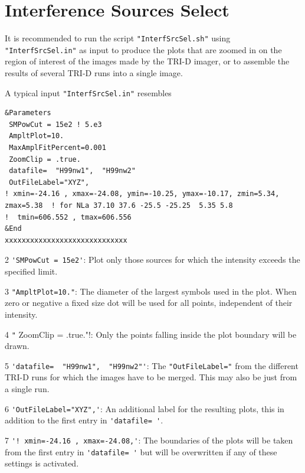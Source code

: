 
\section{Interference Sources Select}

It is recommended to run the script \verb!"InterfSrcSel.sh"! using \verb!"InterfSrcSel.in"! as input to produce the plots that are zoomed in on the region of interest of the images made by the TRI-D imager, or to assemble the results of several TRI-D runs into a single image.

A typical input \verb!"InterfSrcSel.in"! resembles

\begin{linenumbers}
\resetlinenumber
\begin{verbatim}
&Parameters
 SMPowCut = 15e2 ! 5.e3
 AmpltPlot=10.
 MaxAmplFitPercent=0.001
 ZoomClip = .true.
 datafile=  "H99nw1",  "H99nw2"
 OutFileLabel="XYZ",
! xmin=-24.16 , xmax=-24.08, ymin=-10.25, ymax=-10.17, zmin=5.34, zmax=5.38  ! for NLa 37.10 37.6 -25.5 -25.25  5.35 5.8
!  tmin=606.552 , tmax=606.556
&End
xxxxxxxxxxxxxxxxxxxxxxxxxxxxx
\end{verbatim}
\end{linenumbers}

\begin{enumerate*}
\item[2] \verb!'SMPowCut = 15e2'!: Plot only those sources for which the intensity exceeds the specified limit.
\item[3] \verb#"AmpltPlot=10."#: The diameter of the largest symbols used in the plot. When zero or negative a fixed size dot will be used for all points, independent of their intensity.
\item[4] \verb!"! ZoomClip = .true."!: Only the points falling inside the plot boundary will be drawn.
\item[5] \verb#'datafile=  "H99nw1",  "H99nw2"'#: The \verb!"OutFileLabel="! from the different TRI-D runs for which the images have to be merged. This may also be just from a single run.
\item[6] \verb#'OutFileLabel="XYZ",'#: An additional label for the resulting plots, this in addition to the first entry in \verb#'datafile= '#.
\item[7] \verb#'! xmin=-24.16 , xmax=-24.08,'#: The boundaries of the plots will be taken from the first entry in \verb#'datafile= '# but will be overwritten if any of these settings is activated.
\end{enumerate*}

